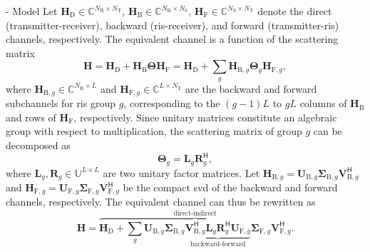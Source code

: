 \documentclass[journal]{IEEEtran}
\begin{document}
\begin{section}{- Model}
	Let $\mathbf{H}_\mathrm{D} \in \mathbb{C}^{N_\mathrm{R} \times N_\mathrm{T}}$, $\mathbf{H}_\mathrm{B} \in \mathbb{C}^{N_\mathrm{R} \times N_\mathrm{S}}$, $\mathbf{H}_\mathrm{F} \in \mathbb{C}^{N_\mathrm{S} \times N_\mathrm{T}}$ denote the direct (transmitter-receiver), backward (\gls{ris}-receiver), and forward (transmitter-\gls{ris}) channels, respectively.
	The equivalent channel is a function of the scattering matrix
	\begin{equation}
		\mathbf{H} = \mathbf{H}_\mathrm{D} + \mathbf{H}_\mathrm{B} \mathbf{\Theta} \mathbf{H}_\mathrm{F} = \mathbf{H}_\mathrm{D} + \sum_g \mathbf{H}_{\mathrm{B},g} \mathbf{\Theta}_g \mathbf{H}_{\mathrm{F},g},
		\label{eq:channel_equivalent}
	\end{equation}
	where $\mathbf{H}_{\mathrm{B},g} \in \mathbb{C}^{N_\mathrm{R} \times L}$ and $\mathbf{H}_{\mathrm{F},g} \in \mathbb{C}^{L \times N_\mathrm{T}}$ are the backward and forward subchannels for \gls{ris} group $g$, corresponding to the $(g-1)L$ to $gL$ columns of $\mathbf{H}_\mathrm{B}$ and rows of $\mathbf{H}_\mathrm{F}$, respectively.
	Since unitary matrices constitute an algebraic group with respect to multiplication, the scattering matrix of group $g$ can be decomposed as
	\begin{equation}
		\mathbf{\Theta}_g = \mathbf{L}_g \mathbf{R}_g^\mathsf{H},
	\end{equation}
	where $\mathbf{L}_g, \mathbf{R}_g \in \mathbb{U}^{L \times L}$ are two unitary factor matrices.
	Let $\mathbf{H}_{\mathrm{B},g} = \mathbf{U}_{\mathrm{B},g} \mathbf{\Sigma}_{\mathrm{B},g} \mathbf{V}_{\mathrm{B},g}^\mathsf{H}$ and $\mathbf{H}_{\mathrm{F},g} = \mathbf{U}_{\mathrm{F},g} \mathbf{\Sigma}_{\mathrm{F},g} \mathbf{V}_{\mathrm{F},g}^\mathsf{H}$ be the compact \gls{svd} of the backward and forward channels, respectively.
	The equivalent channel can thus be rewritten as
	\begin{equation}
		\mathbf{H} = \overbrace{\mathbf{H}_\mathrm{D} + \sum_g \mathbf{U}_{\mathrm{B},g} \mathbf{\Sigma}_{\mathrm{B},g} \underbrace{\mathbf{V}_{\mathrm{B},g}^\mathsf{H} \mathbf{L}_g \mathbf{R}_g^\mathsf{H} \mathbf{U}_{\mathrm{F},g}}_\text{backward-forward} \mathbf{\Sigma}_{\mathrm{F},g} \mathbf{V}_{\mathrm{F},g}^\mathsf{H}}^\text{direct-indirect}.
		\label{eq:channel_equivalent_svd}
	\end{equation}


\end{section}
\end{document}
